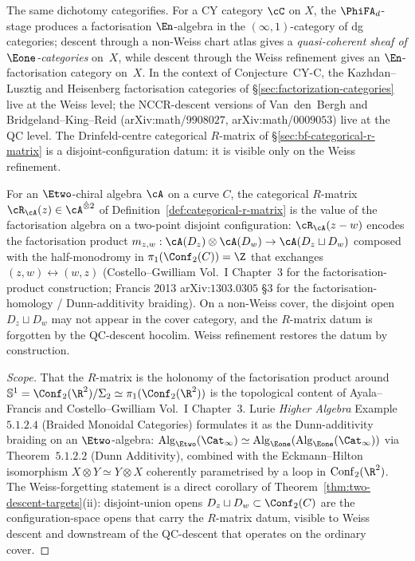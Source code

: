 \begin{remark}
\label{rem:fa-vs-qc-category}
The same dichotomy categorifies. For a CY category $\cC$ on $X$, the $\PhiFA_d$-stage produces a factorisation $\En$-algebra in the $(\infty, 1)$-category of dg categories; descent through a non-Weiss chart atlas gives a \emph{quasi-coherent sheaf of $\Eone$-categories} on~$X$, while descent through the Weiss refinement gives an $\En$-factorisation category on~$X$. In the context of Conjecture~CY-C, the Kazhdan--Lusztig and Heisenberg factorisation categories of §\ref{sec:factorization-categories} live at the Weiss level; the NCCR-descent versions of Van~den~Bergh and Bridgeland--King--Reid (arXiv:math/$9908027$, arXiv:math/$0009053$) live at the QC level. The Drinfeld-centre categorical $R$-matrix of §\ref{sec:bf-categorical-r-matrix} is a disjoint-configuration datum: it is visible only on the Weiss refinement.
\end{remark}

\begin{proposition}
\label{prop:R-matrix-weiss-datum}
For an $\Etwo$-chiral algebra $\cA$ on a curve $C$, the categorical $R$-matrix $\cR_\cA(z) \in \cA^{\hat\otimes 2}$ of Definition~\ref{def:categorical-r-matrix} is the value of the factorisation algebra on a two-point disjoint configuration: $\cR_\cA(z - w)$ encodes the factorisation product $m_{z, w} : \cA(D_z) \otimes \cA(D_w) \to \cA(D_z \sqcup D_w)$ composed with the half-monodromy in $\pi_1(\Conf_2(C)) = \Z$ that exchanges $(z, w) \leftrightarrow (w, z)$ \textup{(}Costello--Gwilliam Vol.~I Chapter~$3$ for the factorisation-product construction; Francis 2013 arXiv:$1303.0305$ §$3$ for the factorisation-homology / Dunn-additivity braiding\textup{).} On a non-Weiss cover, the disjoint open $D_z \sqcup D_w$ may not appear in the cover category, and the $R$-matrix datum is forgotten by the QC-descent hocolim. Weiss refinement restores the datum by construction.
\end{proposition}

\begin{proof}[Scope]
That the $R$-matrix is the holonomy of the factorisation product around $\mathbb S^1 = \Conf_2(\R^2) / \Sigma_2 \simeq \pi_1(\Conf_2(\R^2))$ is the topological content of Ayala--Francis and Costello--Gwilliam Vol.~I Chapter~$3$. Lurie \emph{Higher Algebra} Example~$5.1.2.4$ \textup{(}Braided Monoidal Categories\textup{)} formulates it as the Dunn-additivity braiding on an $\Etwo$-algebra: $\mathrm{Alg}_{\Etwo}(\Cat_\infty) \simeq \mathrm{Alg}_{\Eone}(\mathrm{Alg}_{\Eone}(\Cat_\infty))$ via Theorem~$5.1.2.2$ \textup{(}Dunn Additivity\textup{)}, combined with the Eckmann--Hilton isomorphism $X \otimes Y \simeq Y \otimes X$ coherently parametrised by a loop in $\mathrm{Conf}_2(\R^2)$. The Weiss-forgetting statement is a direct corollary of Theorem~\ref{thm:two-descent-targets}(ii): disjoint-union opens $D_z \sqcup D_w \subset \Conf_2(C)$ are the configuration-space opens that carry the $R$-matrix datum, visible to Weiss descent and downstream of the QC-descent that operates on the ordinary cover.
\end{proof}

